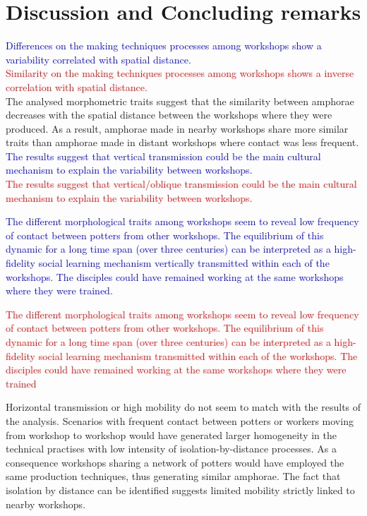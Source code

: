 \documentclass[review]{elsarticle}
\newcommand{\memo}[2]{\textcolor{#1}{#2}}
\newcommand{\maria}[1]{\memo{red}{#1\\}}
\newcommand{\revise}[1]{\memo{blue}{#1\\}}
\begin{document}
\section{Discussion and Concluding remarks}

\revise{Differences on the making techniques processes among workshops show a variability correlated with spatial distance.}
\maria{Similarity on the making techniques processes among workshops shows a inverse correlation with spatial distance.}
The analysed morphometric traits suggest that the similarity between amphorae decreases with the spatial distance between the workshops where they were produced. As a result, amphorae made in nearby workshops share more similar traits than amphorae made in distant workshops where contact was less frequent.
\revise{The results suggest that vertical transmission could be the main cultural mechanism to explain the variability between workshops.} 
\maria{The results suggest that vertical/oblique transmission could be the main cultural mechanism to explain the variability between workshops.}

\revise{The different morphological traits among workshops seem to reveal low frequency of contact between potters from other workshops. The equilibrium of this dynamic for a long time span (over three centuries) can be interpreted as a high-fidelity social learning mechanism vertically transmitted within each of the workshops. The disciples could have remained working at the same workshops where they were trained.}

\maria{The different morphological traits among workshops seem to reveal low frequency of contact between potters from other workshops. The equilibrium of this dynamic for a long time span (over three centuries) can be interpreted as a high-fidelity social learning mechanism transmitted within each of the workshops. The disciples could have remained working at the same workshops where they were trained}

Horizontal transmission or high mobility do not seem to match with the results of the analysis. Scenarios with frequent contact between potters or workers moving from workshop to workshop would have generated larger homogeneity in the technical practises with low intensity of isolation-by-distance processes. As a consequence workshops sharing a network of potters would have employed the same production techniques, thus generating similar amphorae. The fact that isolation by distance can be identified suggests limited mobility strictly linked to nearby workshops.
\end{document}
